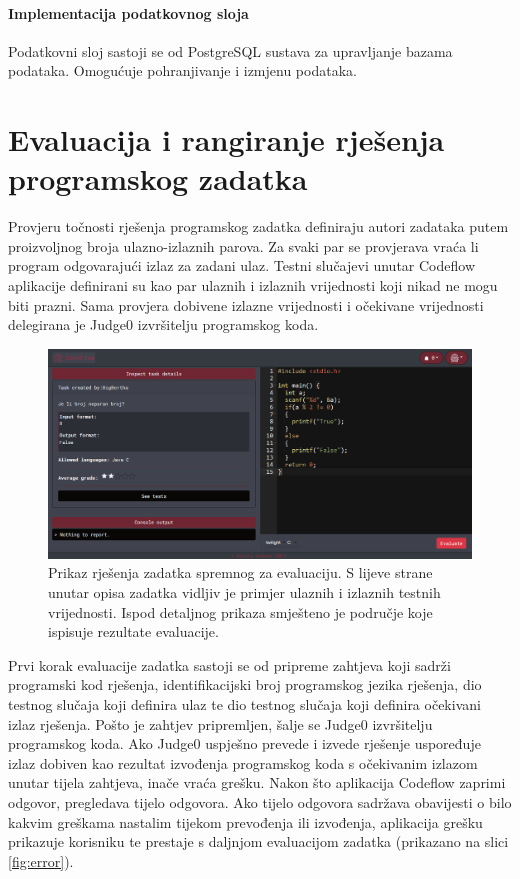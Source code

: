 \documentclass[times, utf8, zavrsni, numeric]{fer}
\begin{document}
			\subsubsection{Implementacija podatkovnog sloja}
			Podatkovni sloj sastoji se od PostgreSQL sustava za upravljanje bazama podataka. Omogućuje pohranjivanje i izmjenu podataka.
			
	\chapter{Evaluacija i rangiranje rješenja programskog zadatka}
	Provjeru točnosti rješenja programskog zadatka definiraju autori zadataka putem proizvoljnog broja ulazno-izlaznih parova. Za svaki par se provjerava vraća li program odgovarajući izlaz za zadani ulaz. Testni slučajevi unutar Codeflow aplikacije definirani su kao par ulaznih i izlaznih vrijednosti koji nikad ne mogu biti prazni. Sama provjera dobivene izlazne vrijednosti i očekivane vrijednosti delegirana je Judge0 izvršitelju programskog koda.\\
	\begin{figure}[H]
		\centering
		\includegraphics[width=\linewidth]{pictures/evaluacija/pocetak.png}
		\caption{Prikaz rješenja zadatka spremnog za evaluaciju. S lijeve strane unutar opisa zadatka vidljiv je primjer ulaznih i izlaznih testnih vrijednosti. Ispod detaljnog prikaza smješteno je područje koje ispisuje rezultate evaluacije.}
		\label{fig:start}
	\end{figure}
	Prvi korak evaluacije zadatka sastoji se od pripreme zahtjeva koji sadrži programski kod rješenja, identifikacijski broj programskog jezika rješenja, dio testnog slučaja koji definira ulaz te dio testnog slučaja koji definira očekivani izlaz rješenja. Pošto je zahtjev pripremljen, šalje se Judge0 izvršitelju programskog koda. Ako Judge0 uspješno prevede i izvede rješenje uspoređuje izlaz dobiven kao rezultat izvođenja programskog koda s očekivanim izlazom unutar tijela zahtjeva, inače vraća grešku. Nakon što aplikacija Codeflow zaprimi odgovor, pregledava tijelo odgovora. Ako tijelo odgovora sadržava obavijesti o bilo kakvim greškama nastalim tijekom prevođenja ili izvođenja, aplikacija grešku prikazuje korisniku te prestaje s daljnjom evaluacijom zadatka (prikazano na slici \ref{fig:error}).
\end{document}
